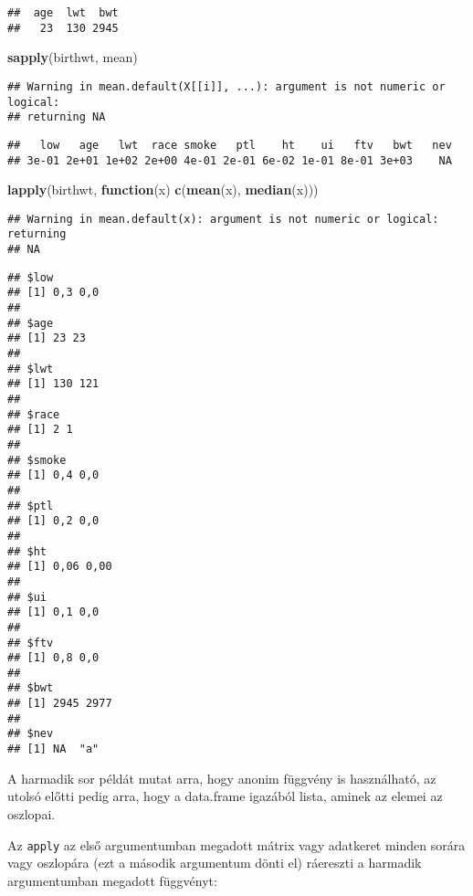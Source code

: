 \documentclass[]{book}
\newenvironment{Shaded}{\begin{snugshade}}{\end{snugshade}}
\newcommand{\KeywordTok}[1]{\textcolor[rgb]{0.13,0.29,0.53}{\textbf{#1}}}
\newcommand{\ControlFlowTok}[1]{\textcolor[rgb]{0.13,0.29,0.53}{\textbf{#1}}}
\newcommand{\NormalTok}[1]{#1}
\begin{document}
\begin{verbatim}
##  age  lwt  bwt 
##   23  130 2945
\end{verbatim}

\begin{Shaded}
\begin{Highlighting}[]
\KeywordTok{sapply}\NormalTok{(birthwt, mean)}
\end{Highlighting}
\end{Shaded}

\begin{verbatim}
## Warning in mean.default(X[[i]], ...): argument is not numeric or logical:
## returning NA
\end{verbatim}

\begin{verbatim}
##   low   age   lwt  race smoke   ptl    ht    ui   ftv   bwt   nev 
## 3e-01 2e+01 1e+02 2e+00 4e-01 2e-01 6e-02 1e-01 8e-01 3e+03    NA
\end{verbatim}

\begin{Shaded}
\begin{Highlighting}[]
\KeywordTok{lapply}\NormalTok{(birthwt, }\ControlFlowTok{function}\NormalTok{(x) }\KeywordTok{c}\NormalTok{(}\KeywordTok{mean}\NormalTok{(x), }\KeywordTok{median}\NormalTok{(x)))}
\end{Highlighting}
\end{Shaded}

\begin{verbatim}
## Warning in mean.default(x): argument is not numeric or logical: returning
## NA
\end{verbatim}

\begin{verbatim}
## $low
## [1] 0,3 0,0
## 
## $age
## [1] 23 23
## 
## $lwt
## [1] 130 121
## 
## $race
## [1] 2 1
## 
## $smoke
## [1] 0,4 0,0
## 
## $ptl
## [1] 0,2 0,0
## 
## $ht
## [1] 0,06 0,00
## 
## $ui
## [1] 0,1 0,0
## 
## $ftv
## [1] 0,8 0,0
## 
## $bwt
## [1] 2945 2977
## 
## $nev
## [1] NA  "a"
\end{verbatim}

A harmadik sor példát mutat arra, hogy anonim függvény is használható,
az utolsó előtti pedig arra, hogy a data.frame igazából lista, aminek az
elemei az oszlopai.

Az \texttt{apply} az első argumentumban megadott mátrix vagy adatkeret
minden sorára vagy oszlopára (ezt a második argumentum dönti el)
ráereszti a harmadik argumentumban megadott függvényt:
\end{document}
